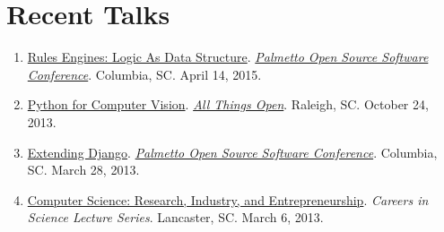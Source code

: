 \documentclass[10pt]{article}
\begin{document}
\renewcommand\refname{Selected Publications}
{\footnotesize }


\section{Recent Talks}
{\footnotesize
\begin{enumerate}[align=left,labelsep=0em]
\renewcommand{\labelenumi}{[\arabic{enumi}]}
\item \href{http://www.malloc47.com/posscon2015/}{Rules Engines: Logic As Data Structure}. \emph{\href{http://posscon.org/}{Palmetto Open Source Software Conference}}. Columbia, SC. April 14, 2015.
\item \href{http://www.malloc47.com/ato2013/}{Python for Computer Vision}. \emph{\href{http://allthingsopen.org/}{All Things Open}}. Raleigh, SC. October 24, 2013.
\item \href{http://www.malloc47.com/posscon2013/}{Extending Django}. \emph{\href{http://posscon.org/}{Palmetto Open Source Software Conference}}.  Columbia, SC.  March 28, 2013.
\item \href{http://www.malloc47.com/cs-careers/}{Computer Science: Research, Industry, and Entrepreneurship}.  \emph{Careers in Science Lecture Series}.  Lancaster, SC.  March 6, 2013.
\end{enumerate} }
\end{document}
